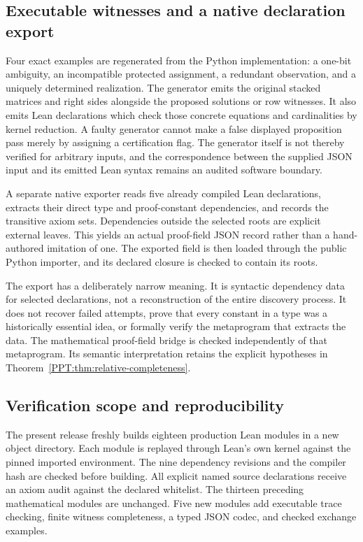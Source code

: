 \subsection{Executable witnesses and a native declaration export}

Four exact examples are regenerated from the Python implementation: a one-bit ambiguity, an incompatible protected assignment, a redundant observation, and a uniquely determined realization. The generator emits the original stacked matrices and right sides alongside the proposed solutions or row witnesses. It also emits Lean declarations which check those concrete equations and cardinalities by kernel reduction. A faulty generator cannot make a false displayed proposition pass merely by assigning a certification flag. The generator itself is not thereby verified for arbitrary inputs, and the correspondence between the supplied JSON input and its emitted Lean syntax remains an audited software boundary.

A separate native exporter reads five already compiled Lean declarations, extracts their direct type and proof-constant dependencies, and records the transitive axiom sets. Dependencies outside the selected roots are explicit external leaves. This yields an actual proof-field JSON record rather than a hand-authored imitation of one. The exported field is then loaded through the public Python importer, and its declared closure is checked to contain its roots.

The export has a deliberately narrow meaning. It is syntactic dependency data for selected declarations, not a reconstruction of the entire discovery process. It does not recover failed attempts, prove that every constant in a type was a historically essential idea, or formally verify the metaprogram that extracts the data. The mathematical proof-field bridge is checked independently of that metaprogram. Its semantic interpretation retains the explicit hypotheses in Theorem~\ref{PPT:thm:relative-completeness}.

\subsection{Verification scope and reproducibility}

The present release freshly builds eighteen production Lean modules in a new object directory. Each module is replayed through Lean's own kernel against the pinned imported environment. The nine dependency revisions and the compiler hash are checked before building. All explicit named source declarations receive an axiom audit against the declared whitelist. The thirteen preceding mathematical modules are unchanged. Five new modules add executable trace checking, finite witness completeness, a typed JSON codec, and checked exchange examples.

